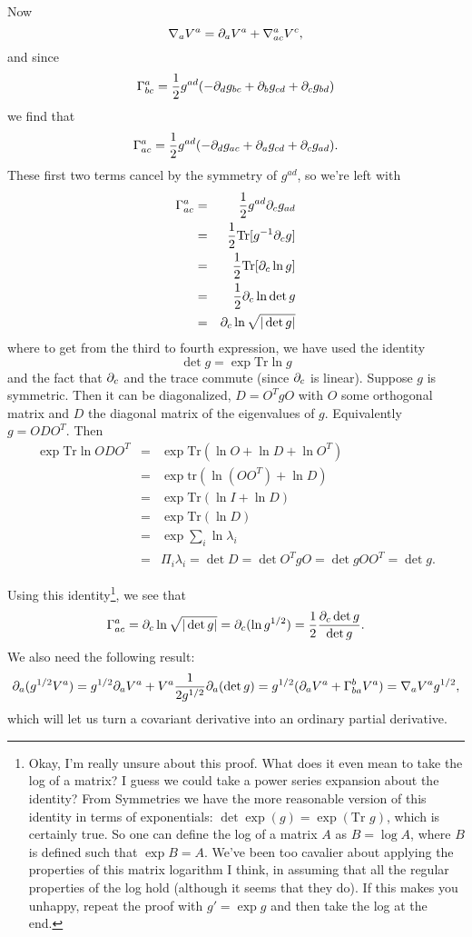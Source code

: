 Now
$$\nabla_a V^a=\partial_a V^a +\nabla^a_{ac} V^c,$$
and since
$$\Gamma^a_{bc}=\frac{1}{2}g^{ad}(-\partial_d g_{bc}+\partial_b g_{cd}+\partial_c g_{bd})$$
we find that
$$\Gamma^a_{ac}=\frac{1}{2}g^{ad}(-\partial_d g_{ac}+\partial_a g_{cd}+\partial_c g_{ad}).$$
These first two terms cancel by the symmetry of $g^{ad}$, so we're left with
\begin{eqnarray*}
\Gamma^a_{ac}&=& \frac{1}{2} g^{ad}\partial_c g_{ad}\\
&=&\frac{1}{2} \text{Tr} [g^{-1}\partial_c g]\\
&=& \frac{1}{2}\text{Tr}[\partial_c \ln g]\\
&=&\frac{1}{2} \partial_c \ln \det g\\
&=&\partial_c \ln \sqrt{|\det g|}
\end{eqnarray*}
where to get from the third to fourth expression, we have used the identity
$$\det g = \exp \text{Tr} \ln g$$
and the fact that $\partial_c$ and the trace commute (since $\partial_c$ is linear).
Suppose $g$ is symmetric. Then it can be diagonalized, $D=O^T g O$ with $O$ some orthogonal matrix and $D$ the diagonal matrix of the eigenvalues of $g$. Equivalently $g=O DO^T.$ Then
\begin{eqnarray*}
\exp \text{Tr}\ln ODO^T&=&\exp \text{Tr}(\ln O + \ln D + \ln O^T)\\
&=&\exp \text{tr}(\ln (O O ^T)+\ln D)\\
&=&\exp \text{Tr}(\ln I + \ln D)\\
&=& \exp \text{Tr}(\ln D)\\
&=&\exp \sum_i \ln \lambda_i\\
&=&\Pi_i \lambda_i = \det D = \det O^T g O = \det g O O^T = \det g.
\end{eqnarray*}

Using this identity\footnote{Okay, I'm really unsure about this proof. What does it even mean to take the log of a matrix? I guess we could take a power series expansion about the identity? From Symmetries we have the more reasonable version of this identity in terms of exponentials: $\det \exp(g)= \exp (\text{Tr } g)$, which is certainly true. So one can define the log of a matrix $A$ as $B=\log A$, where $B$ is defined such that $\exp B = A$. We've been too cavalier about applying the properties of this matrix logarithm I think, in assuming that all the regular properties of the log hold (although it seems that they do). If this makes you unhappy, repeat the proof with $g'=\exp g$ and then take the log at the end.}, 
we see that
$$\Gamma^a_{ac}=\partial_c \ln \sqrt{|\det g|}=\partial_c(\ln g^{1/2})=\frac{1}{2} \frac{\partial_c \det g}{\det g}.$$ 
We also need the following result:
$$\partial_a(g^{1/2} V^a)= g^{1/2} \partial_a V^a + V^a \frac{1}{2 g^{1/2}} \partial_a (\det g) = g^{1/2} (\partial_a V^a + \Gamma^b_{ba} V^a)= \nabla_a V^a g^{1/2},$$
which will let us turn a covariant derivative into an ordinary partial derivative.

